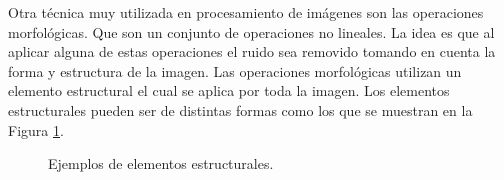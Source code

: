 Otra técnica muy utilizada en procesamiento de imágenes son las operaciones morfológicas. Que son un conjunto de operaciones no lineales. La idea es que al aplicar alguna de estas operaciones el ruido sea removido tomando en cuenta la forma y estructura de la imagen. 
Las operaciones morfológicas \citep{Premaratne2013} utilizan un elemento estructural el cual se aplica por toda la imagen. Los elementos estructurales pueden ser de distintas formas como los que se muestran en la Figura \ref{fig:EX}.
\begin{figure}[h!]
\centering
{} \qquad
{} \qquad
{} 
\caption{Ejemplos de elementos estructurales.} \label{fig:EX}
\end{figure} 

